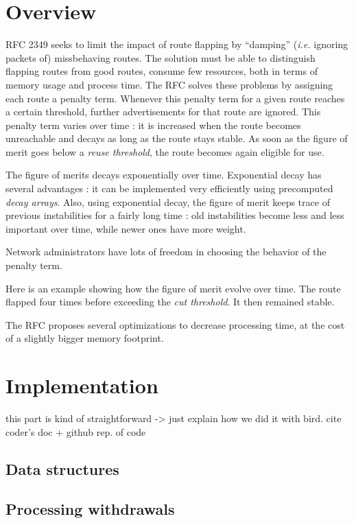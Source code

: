 \documentclass[a4paper,english]{IEEEtran}
\begin{document}
\section{Overview}

RFC 2349 seeks to limit the impact of route flapping by ``damping'' (\textit{i.e.} ignoring packets of) missbehaving routes.
The solution must be able to distinguish flapping routes from good routes, consume few resources, both in terms of memory usage and process time.
The RFC solves these problems by assigning each route a penalty term.
Whenever this penalty term for a given route reaches a certain threshold, further advertisements for that route are ignored.
This penalty term varies over time : it is increased when the route becomes unreachable and decays as long as the route stays stable.
As soon as the figure of merit goes below a \textit{reuse threshold}, the route becomes again eligible for use.

The figure of merits decays exponentially over time.
Exponential decay has several advantages : it can be implemented very efficiently using precomputed \textit{decay arrays}.
Also, using exponential decay, the figure of merit keeps trace of previous instabilities for a fairly long time : old instabilities become less and less important over time, while newer ones have more weight.

Network administrators have lots of freedom in choosing the behavior of the penalty term.

Here is an example showing how the figure of merit evolve over time.
The route flapped four times before exceeding the \textit{cut threshold}.
It then remained stable.

The RFC proposes several optimizations to decrease processing time, at the cost of a slightly bigger memory footprint.

\section{Implementation}

this part is kind of straightforward -> just explain how we did it
with bird. cite coder's doc + github rep. of code


\subsection{Data structures}


\subsection{Processing withdrawals}
\end{document}
